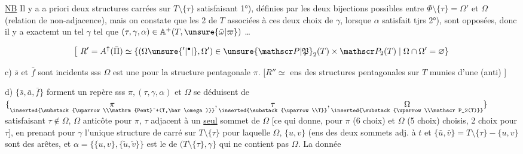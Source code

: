 \uline{NB} Il y a a priori deux structures carrées sur $T\setminus\{\tau\}$ satisfaisant 1°), définies par les deux bijections possibles entre $\Phi\setminus\{\tau\}=\Omega'$ et $\Omega$ (relation de non-adjacence), mais on constate que les 2   de $T$ associées à ces deux choix de $\gamma$, lorsque $\alpha$ satisfait tjrs 2°), sont opposées, donc il y a exactemt un tel $\gamma$ tel que $(\tau,\gamma,\alpha)\in\mathbb A^+(T,\unsure{\bar\omega|\varpi})$ \ldots

\[
\bigl[\ R'=A^{\uparrow}(\bar\Pi)\simeq
\{(\Omega\unsure{'|^{\bullet}|\mbox{}},\Omega')\in\unsure{\mathscr P|\mathfrak P}_2(T)\times\mathscr P_2(T)\mid\Omega\cap\Omega'=\varnothing\}
\]

c) $\bar s$ et $\bar f$ sont incidents sss $\Omega$ est une \uline{} pour la structure pentagonale $\pi$. [$R''\simeq{}$ ens des structures pentagonales sur $T$ munies d'une (anti)  ]


d) $\{\bar s,\bar a,\bar f\}$ forment un repère sss $\pi,(\tau,\gamma,\alpha)$ et $\Omega$ se déduisent de
$\{\underset{\inserted{\substack{\uparrow\\\mathrm{Pent}^+(T,\bar\omega)}}}{\pi},
\underset{\inserted{\substack{\uparrow\\T}}}{\tau},
\underset{\inserted{\substack{\uparrow\\\mathscr P_2(T)}}}{\Omega}\}$
satisfaisant $\tau\notin\Omega$, $\Omega$ anticôte pour $\pi$, $\tau$ adjacent  à un \uline{seul} sommet de $\Omega$
[ce qui donne, pour  $\pi$ (6 choix) et $\Omega$ (5  choix) choisis, 2 choix pour $\tau$], en prenant pour $\gamma$ l'unique structure de carré sur $T\setminus\{\tau\}$ pour laquelle $\Omega$, $\{u,v\}$ (ens des deux sommets adj. à $t$ \unsure{\}|)} et $\{\bar u,\bar v\}=T\setminus\{\tau\}-\{u,v\}$ sont des arêtes, et $\alpha=\{\{u,v\},\{\tilde u,\tilde v\}\}$ est le  de $(T\setminus\{\tau\},\gamma\}$ qui ne contient pas $\Omega$. La donnée

